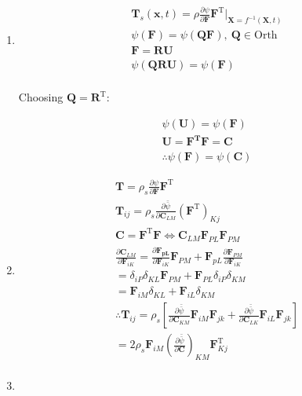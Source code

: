 \begin{problem}
    \noindent
    \normalfont

   \begin{enumerate}
    \item
\begin{align}
\mathbf{T}_{s}(\mathbf{x},t)=\rho \frac{ \partial \psi }{ \partial \mathbf{F} } \mathbf{F}^{\text{T}}\rvert_{\mathbf{X}=f^{-1}(\mathbf{X},t)} \\
\psi(\mathbf{F})=\psi(\mathbf{Q}\mathbf{F}), \ \mathbf{Q}\in \text{Orth} \\
\mathbf{F}=\mathbf{RU} \\
\psi(\mathbf{QRU})=\psi(\mathbf{F})  \\
\end{align}


Choosing $\mathbf{Q}=\mathbf{R}^{\text{T}}$:

\begin{align}
\psi(\mathbf{U})=\psi(\mathbf{F}) \\
\mathbf{U}=\mathbf{F^{\text{T}}F}=\mathbf{C} \\
\therefore\psi(\mathbf{F})=\psi(\mathbf{C})
\end{align}
\item 
\begin{align}
\mathbf{T}=\rho_{s}\frac{ \partial \psi }{ \partial \mathbf{F} } \mathbf{F}^{\text{T}} \\
\mathbf{T}_{ij}=\rho_{s}\frac{ \partial \bar{\bar{\psi}} }{ \partial \mathbf{C}_{LM} } (\mathbf{F}^{\text{T}})_{Kj} \\
\mathbf{C}=\mathbf{F}^\text{{T}}\mathbf{F}\iff \mathbf{C}_{LM}\mathbf{F}_{PL}\mathbf{F}_{PM} \\
\frac{ \partial \mathbf{C}_{LM} }{ \partial \mathbf{F}_{iK} } =\frac{ \partial \mathbf{F_{pL}} }{ \partial \mathbf{F}_{iK} } \mathbf{F}_{PM}+\mathbf{F}_{pL}\frac{ \partial \mathbf{F}_{PM} }{ \partial \mathbf{F}_{iK} }  \\
=\delta_{iP}\delta_{KL}\mathbf{F}_{PM}+\mathbf{F}_{PL}\delta_{iP}\delta_{KM} \\
=\mathbf{F}_{iM}\delta_{KL}+\mathbf{F}_{iL}\delta_{KM} \\
\therefore \mathbf{T}_{ij}=\rho_{s}\left[ \frac{ \partial \bar{\bar{\psi}} }{ \partial \mathbf{C}_{KM} }  \mathbf{F}_{iM}\mathbf{F}_{jk}+\frac{ \partial \bar{\bar{\psi}} }{ \partial \mathbf{C}_{LK} }\mathbf{F}_{iL}\mathbf{F}_{jk} \right] \\
=2\rho_{s}\mathbf{F}_{iM}\left( \frac{ \partial \bar{\bar{\psi}} }{ \partial \mathbf{C} }  \right)_{KM}\mathbf{F}^{\text{T}}_{Kj} \\
\end{align}
\item 


\end{enumerate}
\end{problem}
